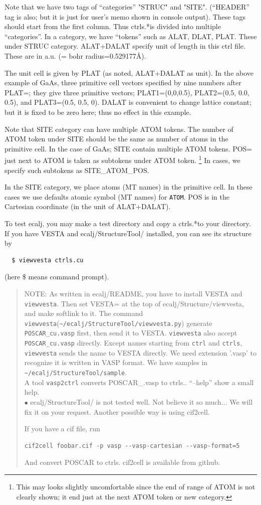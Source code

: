 \documentclass[a4paper,10pt,epsf,fleqn]{article}
\newcommand{\io}[1]{{\sf  #1}\index{#1}}
\newcommand{\ctrls}{{\io{ctrls.*}\space }}
\begin{document}
Note that we have two tags of ``categories'' "STRUC" and "SITE". 
(``HEADER'' tag is also; but it is just for user's memo shown in console output).
These tags should start from the first column. 
Thus \ctrls is divided into multiple ``categories''.
In a category, we have ``tokens'' such as ALAT, DLAT, PLAT. 
These under STRUC category. 
ALAT+DALAT specify unit of length in this ctrl file.
These are in a.u. (= bohr radius=0.529177\AA). 

The unit cell is given by PLAT (as noted, ALAT+DALAT as unit).
In the above example of GaAs, three primitive cell vectors specified by nine
numbers after PLAT=; they give three primitive vectors;
PLAT1=(0,0,0.5), PLAT2=(0.5, 0.0, 0.5), and PLAT3=(0.5, 0.5, 0). 
DALAT is convenient to change lattice constant; but it is fixed to be
zero here; thus no effect in this example.

Note that SITE category can have multiple ATOM tokens. The number of
ATOM token under SITE should be the same as number of atoms in the primitive cell.
In the case of GaAs; SITE contain multiple ATOM tokens.
POS= just next to ATOM is taken as subtokens under ATOM token. 
\footnote{This may looks slightly uncomfortable since the end of range of ATOM
 is not clearly shown; it end just at the next ATOM token or new category.}
In cases, we specify such subtokens as SITE\_ATOM\_POS.

In the SITE category, we place atoms (MT names) in the primitive cell.
In these cases we use defaults atomic symbol (MT names) for \verb+ATOM+.
POS is in the Cartesian coordinate (in the unit of ALAT+DALAT).

To test ecalj, you may make a test directory and copy a \ctrls to your directory.
If you have VESTA and ecalj/StructureTool/ installed, you can see its structure by 
\begin{verbatim}
  $ viewvesta ctrls.cu
\end{verbatim}
(here \$ means command prompt).
\begin{quote}
NOTE: As written in ecalj/README, you have to install VESTA and \verb+viewvesta+. 
Then set VESTA= at the top of ecalj/Structure/viewvesta, and make softlink to it.
The command \verb+viewvesta+(\verb+~/ecalj/StructureTool/viewvesta.py+)
generate \verb+POSCAR_cu.vasp+ first, then send it to VESTA.
\verb+viewvesta+ also accept \verb+POSCAR_cu.vasp+ directly.
Except names starting from \verb+ctrl+ and \verb+ctrls+,
\verb+viewvesta+ sends the name to VESTA directly. 
We need extension '.vasp' to recognize it is written in VASP format.
We have samples in \verb+~/ecalj/StructureTool/sample+.\\
A tool \verb+vasp2ctrl+ converts POSCAR\_\*.vasp to ctrls.\*.
``--help'' show a small help. \\
$\bullet$ ecalj/StructureTool/ is not tested well. Not believe it so
much... We will fix it on your request.
Another possible way is using cif2cell.

If you have a cif file, run
\begin{verbatim}
cif2cell foobar.cif -p vasp --vasp-cartesian --vasp-format=5
\end{verbatim}
And convert POSCAR to ctrls. cif2cell is available from github.
\end{quote}
\end{document}
